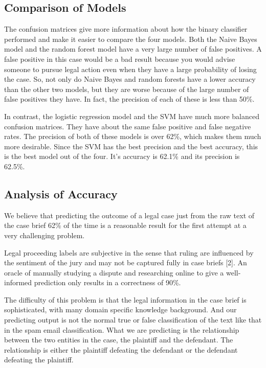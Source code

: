 \documentclass[journal]{IEEEtran}
\begin{document}
\subsection{Comparison of Models}

The confusion matrices give more information about how the binary classifier performed and make it easier to compare the four models. Both the Naive Bayes model and the random forest model have a very large number of false positives. A false positive in this case would be a bad result because you would advise someone to pursue legal action even when they have a large probability of losing the case. So, not only do Naive Bayes and random forests have a lower accuracy than the other two models, but they are worse because of the large number of false positives they have. In fact, the precision of each of these is less than 50\%.

In contrast, the logistic regression model and the SVM have much more balanced confusion matrices. They have about the same false positive and false negative rates. The precision of both of these models is over 62\%, which makes them much more desirable. Since the SVM has the best precision and the best accuracy, this is the best model out of the four. It's accuracy is 62.1\% and its precision is 62.5\%. 

\subsection{Analysis of Accuracy}

We believe that predicting the outcome of a legal case just from the raw text of the case brief 62\% of the time is a reasonable result for the first attempt at a very challenging problem. 

Legal proceeding labels are subjective in the sense that ruling are influenced by the sentiment of the jury and may not be captured fully in case briefs [2]. An oracle of manually studying a dispute and researching online to give a well-informed prediction only results in a correctness of 90\%.

The difficulty of this problem is that the legal information in the case brief is sophisticated, with many domain specific knowledge background. And our predicting output is not the normal true or false classification of the text like that in the spam email classification. What we are predicting is the relationship between the two entities in the case, the plaintiff and the defendant. The relationship is either the plaintiff defeating the defendant or the defendant defeating the plaintiff.
\end{document}
